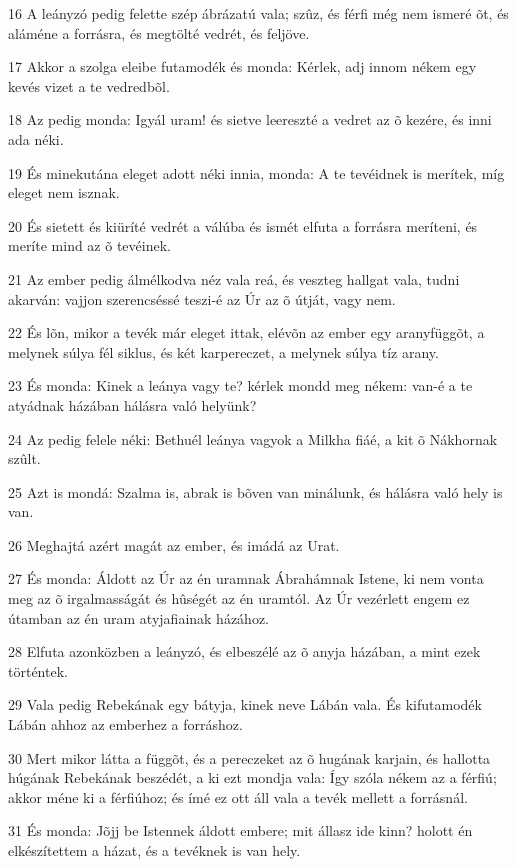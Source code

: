 \par 16 A leányzó pedig felette szép ábrázatú vala; szûz, és férfi még nem ismeré õt, és aláméne a forrásra, és megtölté vedrét, és feljöve.
\par 17 Akkor a szolga eleibe futamodék és monda: Kérlek, adj innom nékem egy kevés vizet a te vedredbõl.
\par 18 Az pedig monda: Igyál uram! és sietve leereszté a vedret az õ kezére, és inni ada néki.
\par 19 És minekutána eleget adott néki innia, monda: A te tevéidnek is merítek, míg eleget nem isznak.
\par 20 És sietett és kiüríté vedrét a válúba és ismét elfuta a forrásra meríteni, és meríte mind az õ tevéinek.
\par 21 Az ember pedig álmélkodva néz vala reá, és veszteg hallgat vala, tudni akarván: vajjon szerencséssé teszi-é az Úr az õ útját, vagy nem.
\par 22 És lõn, mikor a tevék már eleget ittak, elévõn az ember egy aranyfüggõt, a melynek súlya fél siklus, és két karpereczet, a melynek súlya tíz arany.
\par 23 És monda: Kinek a leánya vagy te? kérlek mondd meg nékem: van-é a te atyádnak házában hálásra való helyünk?
\par 24 Az pedig felele néki: Bethuél leánya vagyok a Milkha fiáé, a kit õ Nákhornak szûlt.
\par 25 Azt is mondá: Szalma is, abrak is bõven van minálunk, és hálásra való hely is van.
\par 26 Meghajtá azért magát az ember, és imádá az Urat.
\par 27 És monda: Áldott az Úr az én uramnak Ábrahámnak Istene, ki nem vonta meg az õ irgalmasságát és hûségét az én uramtól. Az Úr vezérlett engem ez útamban az én uram atyjafiainak házához.
\par 28 Elfuta azonközben a leányzó, és elbeszélé az õ anyja házában, a mint ezek történtek.
\par 29 Vala pedig Rebekának egy bátyja, kinek neve Lábán vala. És kifutamodék Lábán ahhoz az emberhez a forráshoz.
\par 30 Mert mikor látta a függõt, és a pereczeket az õ hugának karjain, és hallotta húgának Rebekának beszédét, a ki ezt mondja vala: Így szóla nékem az a férfiú; akkor méne ki a férfiúhoz; és ímé ez ott áll vala a tevék mellett a forrásnál.
\par 31 És monda: Jõjj be Istennek áldott embere; mit állasz ide kinn? holott én elkészítettem a házat, és a tevéknek is van hely.
